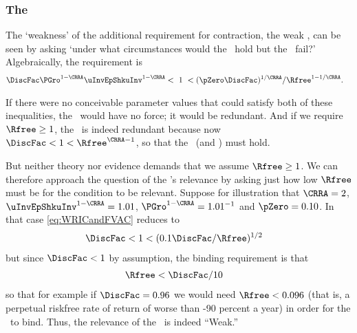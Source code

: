 \documentclass[./BufferStockTheory.tex]{subfiles}
\begin{document}
\subsubsection{The \WRIC}

The `weakness' of the additional requirement for contraction, the
weak \RIC, can be seen by asking `under what circumstances
would the \FVAC~hold but the \WRIC~fail?'
Algebraically, the requirement is
\begin{equation}\begin{gathered}\begin{aligned}
 \DiscFac \PGro^{1-\CRRA}\uInvEpShkuInv^{1-\CRRA} & < ~ 1 ~ <  (\pZero \DiscFac)^{1/\CRRA}/\Rfree^{1-1/\CRRA}. \label{eq:WRICandFVAC}
\end{aligned}\end{gathered}\end{equation}

If there were no conceivable parameter values that could satisfy both
of these inequalities, the \WRIC~would have no force; it would be
redundant.  And if we require $\Rfree \geq 1$, the \WRIC~is indeed
redundant because now $\DiscFac <1<\Rfree^{\CRRA-1}$, so that the \RIC~(and \WRIC) must hold.

But neither theory nor evidence demands that we assume $\Rfree \geq
1$.  We can therefore approach the question of the \WRIC's relevance by
asking just how low $\Rfree$ must be for the condition to be relevant.
Suppose for illustration that $\CRRA=2$, $\uInvEpShkuInv^{1-\CRRA}=1.01$,
$\PGro^{1-\CRRA}=1.01^{-1}$ and $\pZero = 0.10$.  In that case
\eqref{eq:WRICandFVAC} reduces to
\begin{equation}\begin{gathered}\begin{aligned}
  \DiscFac  & < 1 < (0.1 \DiscFac/\Rfree)^{1/2} \notag
\end{aligned}\end{gathered}\end{equation}
but since $\DiscFac < 1$ by assumption, the binding requirement is that
\begin{equation}\begin{gathered}\begin{aligned}
  \Rfree  & < \DiscFac/10 \notag
\end{aligned}\end{gathered}\end{equation}
so that for example if $\DiscFac=0.96$ we would need $\Rfree < 0.096$
(that is, a perpetual riskfree rate of return of worse than -90
percent a year) in order for the \WRIC~to bind.
Thus, the relevance of the \WRIC~is indeed ``Weak.''
\end{document}

